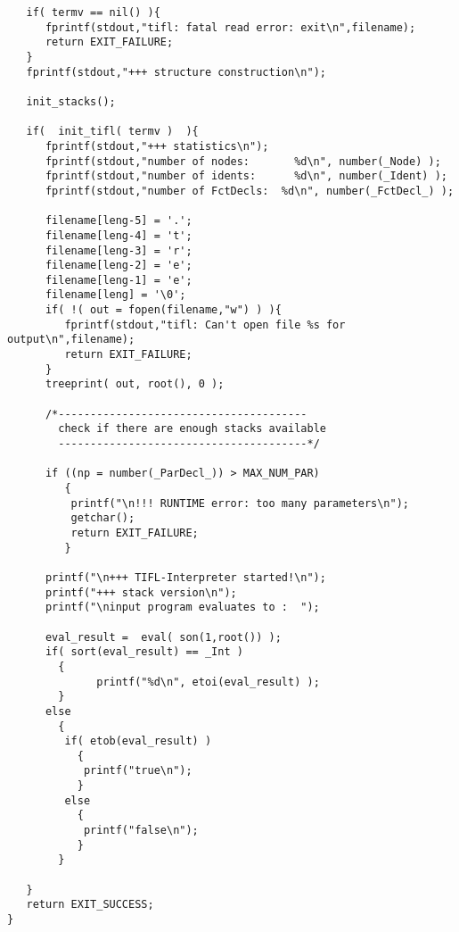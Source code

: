 \begin{verbatim}
   if( termv == nil() ){
      fprintf(stdout,"tifl: fatal read error: exit\n",filename);
      return EXIT_FAILURE;
   }
   fprintf(stdout,"+++ structure construction\n");

   init_stacks();

   if(  init_tifl( termv )  ){
      fprintf(stdout,"+++ statistics\n");
      fprintf(stdout,"number of nodes:       %d\n", number(_Node) );
      fprintf(stdout,"number of idents:      %d\n", number(_Ident) );
      fprintf(stdout,"number of FctDecls:  %d\n", number(_FctDecl_) );

      filename[leng-5] = '.';
      filename[leng-4] = 't';
      filename[leng-3] = 'r';
      filename[leng-2] = 'e';
      filename[leng-1] = 'e';
      filename[leng] = '\0';
      if( !( out = fopen(filename,"w") ) ){
         fprintf(stdout,"tifl: Can't open file %s for output\n",filename);
         return EXIT_FAILURE;
      }
      treeprint( out, root(), 0 );

      /*---------------------------------------
        check if there are enough stacks available
        ---------------------------------------*/

      if ((np = number(_ParDecl_)) > MAX_NUM_PAR)
         { 
          printf("\n!!! RUNTIME error: too many parameters\n");
          getchar();
          return EXIT_FAILURE;
         }

      printf("\n+++ TIFL-Interpreter started!\n");
      printf("+++ stack version\n");
      printf("\ninput program evaluates to :  ");

      eval_result =  eval( son(1,root()) );
      if( sort(eval_result) == _Int )
        {
              printf("%d\n", etoi(eval_result) );
        }
      else
        {
         if( etob(eval_result) )
           {
            printf("true\n");
           }
         else
           {
            printf("false\n");
           }
        }

   }
   return EXIT_SUCCESS;
}

\end{verbatim}


